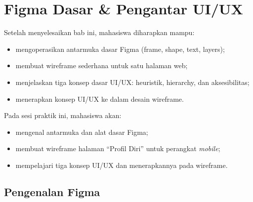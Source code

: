 
\chapter{Figma Dasar \& Pengantar UI/UX}
\label{chap:minggu-02}

\begin{capaian}
Setelah menyelesaikan bab ini, mahasiswa diharapkan mampu:
\begin{itemize}
  \item mengoperasikan antarmuka dasar Figma (frame, shape, text, layers);
  \item membuat wireframe sederhana untuk satu halaman web;
  \item menjelaskan tiga konsep dasar UI/UX: heuristik, hierarchy, dan aksesibilitas;
  \item menerapkan konsep UI/UX ke dalam desain wireframe.
\end{itemize}
\end{capaian}

\begin{tujuanpraktik}
Pada sesi praktik ini, mahasiswa akan:
\begin{itemize}
  \item mengenal antarmuka dan alat dasar Figma;
  \item membuat wireframe halaman ``Profil Diri'' untuk perangkat \emph{mobile};
  \item mempelajari tiga konsep UI/UX dan menerapkannya pada wireframe.
\end{itemize}
\end{tujuanpraktik}

\section{Pengenalan Figma}
\label{sec:m02-figma}

